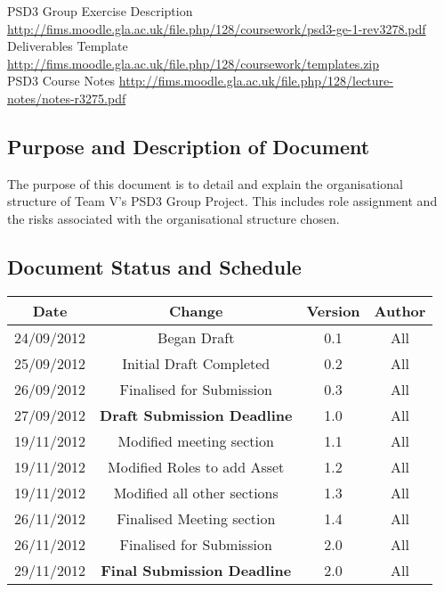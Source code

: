 \documentclass{l3deliverable}
\begin{document}
{{PSD3 Group Exercise Description \url{http://fims.moodle.gla.ac.uk/file.php/128/coursework/psd3-ge-1-rev3278.pdf}}\\

Deliverables Template \url{http://fims.moodle.gla.ac.uk/file.php/128/coursework/templates.zip}\\

PSD3 Course Notes \url{http://fims.moodle.gla.ac.uk/file.php/128/lecture-notes/notes-r3275.pdf}\\
 
\subsection{Purpose and Description of Document}

The purpose of this document is to detail and explain the organisational structure of Team V's PSD3
Group Project. This includes role assignment and the risks associated with the organisational structure
chosen.

\subsection{Document Status and Schedule}

\begin{center}{
\begin{tabular}{|c|c|c|c|}
\hline \textbf{Date} &\textbf{Change} & \textbf{Version} & \textbf{Author}\\ 
\hline 24/09/2012 & Began Draft & 0.1 & All \\ 
\hline 25/09/2012 & Initial Draft Completed & 0.2 & All \\ 
\hline 26/09/2012 & Finalised for Submission & 0.3 & All\\ 
\hline 27/09/2012 & \textbf{Draft Submission Deadline} & 1.0 & All\\ 
\hline
\hline 19/11/2012 & Modified meeting section & 1.1 & All\\
\hline 19/11/2012 & Modified Roles to add Asset & 1.2 & All\\
\hline 19/11/2012 & Modified all other sections & 1.3 & All\\
\hline 26/11/2012 & Finalised Meeting section & 1.4 & All\\
\hline 26/11/2012 & Finalised for Submission & 2.0 & All\\
\hline 29/11/2012 & \textbf{Final Submission Deadline} & 2.0 & All\\ 
\hline 
\end{tabular} }
\end{center}

}
\end{document}
